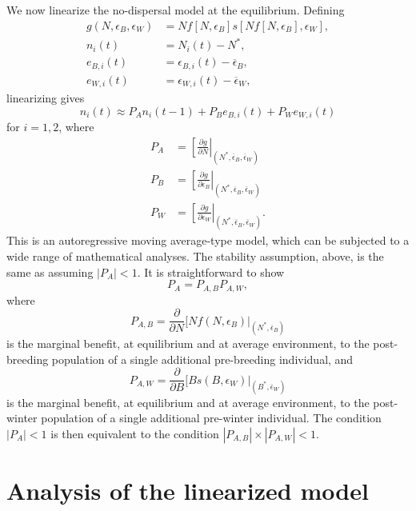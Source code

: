 \documentclass[letterpaper,11pt]{article}
\newcommand{\ole}{\overline{\epsilon}}
\begin{document}
We now linearize the no-dispersal model at the equilibrium. Defining
\begin{align}
g(N,\epsilon_B,\epsilon_W) &= N f[N,\epsilon_B] s[N f[N,\epsilon_B],\epsilon_W], \\
n_i(t) &= N_i(t)-N^*, \\
e_{B,i}(t) &= \epsilon_{B,i}(t)-\ole_B, \\
e_{W,i}(t) &= \epsilon_{W,i}(t)-\ole_W,
\end{align}
linearizing gives
\begin{equation}
n_i(t) \approx P_A n_i(t-1) + P_B e_{B,i}(t) + P_W e_{W,i}(t)\label{eq:lin_model}
\end{equation}
for $i=1,2$, where
\begin{align}
P_A &= \left[ \frac{\partial g}{\partial N} \right|_{(N^*,\ole_B,\ole_W)} \\
P_B &= \left[ \frac{\partial g}{\partial \epsilon_B} \right|_{(N^*,\ole_B,\ole_W)} \\
P_W &= \left[ \frac{\partial g}{\partial \epsilon_W} \right|_{(N^*,\ole_B,\ole_W)}.
\end{align}
This is an autoregressive moving average-type model, which can be subjected
to a wide range of mathematical analyses. The stability assumption, above,
is the same as assuming $|P_A|<1$. It is straightforward to show
\begin{equation}
P_A= P_{A,B} P_{A,W},
\end{equation}
where
\begin{equation}
P_{A,B} = \frac{\partial}{\partial N} [Nf(N,\epsilon_B)|_{(N^*,\ole_B)} 
\end{equation}
is the marginal benefit, at equilibrium and at average environment, to the post-breeding population
of a single additional pre-breeding individual, and
\begin{equation}
P_{A,W}= \frac{\partial}{\partial B} [ Bs(B,\epsilon_W) |_{(B^*,\ole_W)} 
\end{equation}
is the marginal benefit, at equilibrium and at average environment, to the post-winter population
of a single additional pre-winter individual. 
The condition $|P_A|<1$ is then equivalent to the condition 
$| P_{A,B} | \times | P_{A,W} | <1$.

\section{Analysis of the linearized model}
\end{document}
